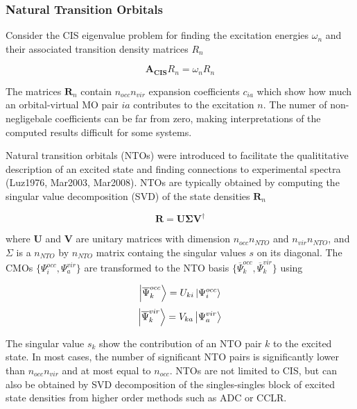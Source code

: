 
\subsubsection*{Natural Transition Orbitals}

Consider the CIS eigenvalue problem for finding the excitation energies $\omega_n$ and their associated transition density matrices $R_n$

\begin{equation}
\mathbf{A_{CIS}} R_n = \omega_n R_n 
\end{equation}

The matrices $\mathbf{R}_n$ contain $n_{occ}n_{vir}$ expansion coefficients $c_{ia}$ which show how much an orbital-virtual MO pair $ia$ contributes to the excitation $n$. The numer of non-negligebale coefficients can be far from zero, making interpretations of the computed results difficult for some systems.

Natural transition orbitals (NTOs) were introduced to facilitate the qualititative description of an excited state and finding connections to experimental spectra (Luz1976, Mar2003, Mar2008). NTOs are typically obtained by computing the singular value decomposition (SVD) of the state densities $\mathbf{R}_n$

\begin{equation}
\mathbf{R} = \mathbf{U} \mathbf{\Sigma} \mathbf{V}^{\dagger}  
\end{equation} 

\noindent where $\mathbf{U}$ and $\mathbf{V}$ are unitary matrices with dimension $n_{occ} n_{NTO}$ and $n_{vir}n_{NTO}$, and $\Sigma$ is a $n_{NTO}$ by $n_{NTO}$ matrix containg the singular values $s$ on its diagonal. The CMOs $\{\Psi^{occ}_i,\Psi^{vir}_a\}$ are transformed to the NTO basis $\{\overline{\Psi}^{occ}_k,\overline{\Psi}^{vir}_k\}$ using

\begin{equation}
\ket{\overline{\Psi}^{occ}_k} = U_{ki} \ket{\Psi^{occ}_i}
\end{equation}
\begin{equation}
\ket{\overline{\Psi}^{vir}_k} = V_{ka} \ket{\Psi^{vir}_a}
\end{equation}

\noindent The singular value $s_k$ show the contribution of an NTO pair $k$ to the excited state. In most cases, the number of significant NTO pairs is significantly lower than $n_{occ}n_{vir}$ and at most equal to $n_{occ}$. NTOs are not limited to CIS, but can also be obtained by SVD decomposition of the singles-singles block of excited state densities from higher order methods such as ADC or CCLR. 

